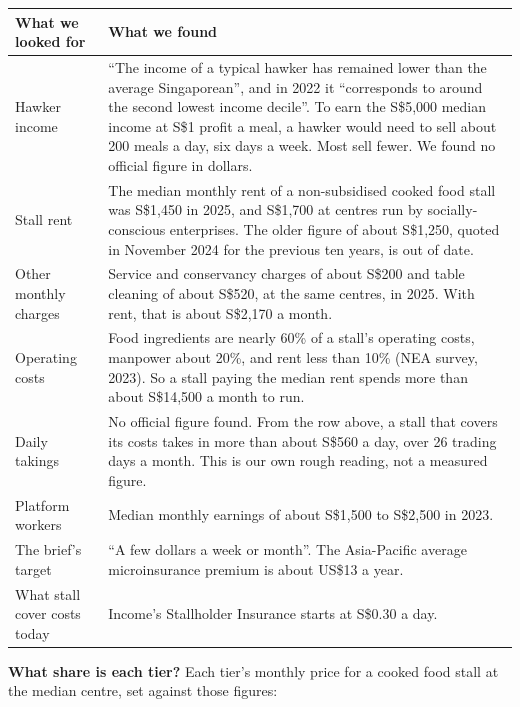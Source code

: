 \documentclass[11pt,a4paper]{article}
\newcommand{\head}{\rowcolor{soft}}
\newcommand{\sgd}{\textup{S\$}}
\begin{document}
{\small
\begin{xltabular}{\textwidth}{|K{3.2cm}|Y|}
\hline
\head What we looked for & \textbf{What we found} \\
\hline
\endhead
Hawker income & ``The income of a typical hawker has remained lower than the average Singaporean'', and in 2022 it ``corresponds to around the second lowest income decile''. To earn the \sgd 5,000 median income at \sgd 1 profit a meal, a hawker would need to sell about 200 meals a day, six days a week. Most sell fewer.\cite{koh-hawker} We found no official figure in dollars. \\
\hline
Stall rent & The median monthly rent of a non-subsidised cooked food stall was \sgd 1,450 in 2025, and \sgd 1,700 at centres run by socially-conscious enterprises.\cite{mse-rent} The older figure of about \sgd 1,250, quoted in November 2024 for the previous ten years, is out of date.\cite{koh-hawker} \\
\hline
Other monthly charges & Service and conservancy charges of about \sgd 200 and table cleaning of about \sgd 520, at the same centres, in 2025.\cite{mse-rent} With rent, that is about \sgd 2,170 a month. \\
\hline
Operating costs & Food ingredients are nearly 60\% of a stall's operating costs, manpower about 20\%, and rent less than 10\% (NEA survey, 2023).\cite{koh-hawker} So a stall paying the median rent spends more than about \sgd 14,500 a month to run. \\
\hline
Daily takings & No official figure found. From the row above, a stall that covers its costs takes in more than about \sgd 560 a day, over 26 trading days a month. This is our own rough reading, not a measured figure. \\
\hline
Platform workers & Median monthly earnings of about \sgd 1,500 to \sgd 2,500 in 2023.\cite{mom-platform} \\
\hline
The brief's target & ``A few dollars a week or month''. The Asia-Pacific average microinsurance premium is about US\$13 a year.\cite{ps} \\
\hline
What stall cover costs today & Income's Stallholder Insurance starts at \sgd 0.30 a day.\cite{income-stall} \\
\hline
\end{xltabular}}

\textbf{What share is each tier?} Each tier's monthly price for a cooked food stall at the median centre, set against those figures:
\end{document}
